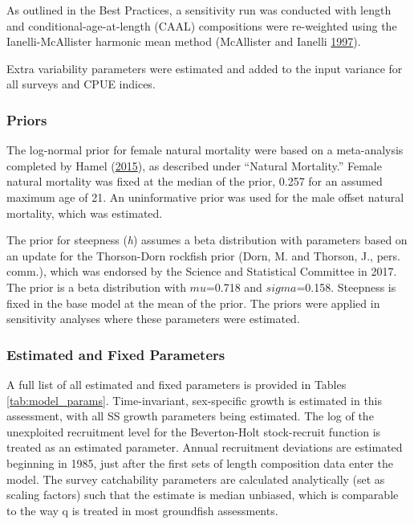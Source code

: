 \documentclass[12pt,]{article}
\begin{document}
As outlined in the Best Practices, a sensitivity run was conducted with
length and conditional-age-at-length (CAAL) compositions were
re-weighted using the Ianelli-McAllister harmonic mean method
(McAllister and Ianelli \protect\hyperlink{ref-McAllister1997}{1997}).

Extra variability parameters were estimated and added to the input
variance for all surveys and CPUE indices.

\subsubsection{Priors}\label{priors}

The log-normal prior for female natural mortality were based on a
meta-analysis completed by Hamel
(\protect\hyperlink{ref-Hamel2015}{2015}), as described under ``Natural
Mortality.'' Female natural mortality was fixed at the median of the
prior, 0.257 for an assumed maximum age of 21. An uninformative prior
was used for the male offset natural mortality, which was estimated.

The prior for steepness (\emph{h}) assumes a beta distribution with
parameters based on an update for the Thorson-Dorn rockfish prior (Dorn,
M. and Thorson, J., pers. comm.), which was endorsed by the Science and
Statistical Committee in 2017. The prior is a beta distribution with
\(mu\)=0.718 and \(sigma\)=0.158. Steepness is fixed in the base model
at the mean of the prior. The priors were applied in sensitivity
analyses where these parameters were estimated.

\subsubsection{Estimated and Fixed
Parameters}\label{estimated-and-fixed-parameters}

A full list of all estimated and fixed parameters is provided in Tables
\ref{tab:model_params}. Time-invariant, sex-specific growth is estimated
in this assessment, with all SS growth parameters being estimated. The
log of the unexploited recruitment level for the Beverton-Holt
stock-recruit function is treated as an estimated parameter. Annual
recruitment deviations are estimated beginning in 1985, just after the
first sets of length composition data enter the model. The survey
catchability parameters are calculated analytically (set as scaling
factors) such that the estimate is median unbiased, which is comparable
to the way q is treated in most groundfish assessments.
\end{document}
